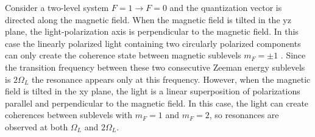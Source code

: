 Consider a two-level system $F=1\rightarrow F=0$ and the quantization vector is directed along the magnetic field. When the magnetic field is tilted in the yz plane, the light-polarization axis is perpendicular to the magnetic field. In this case the linearly polarized light containing two circularly polarized components can only create the coherence state between magnetic sublevels $m_F=\pm 1$ . Since the transition frequency between these two consecutive Zeeman energy sublevels is $2\Omega_L$  the resonance appears only at this frequency. However, when the magnetic field is tilted  in the xy plane, the light is a linear superposition of polarizations parallel and perpendicular to the magnetic field. In this case, the light can create coherences between sublevels with $m_F=1$ and $m_F=2$, so resonances are observed at both $\Omega_L $ and $2\Omega_L$. 
 
 

